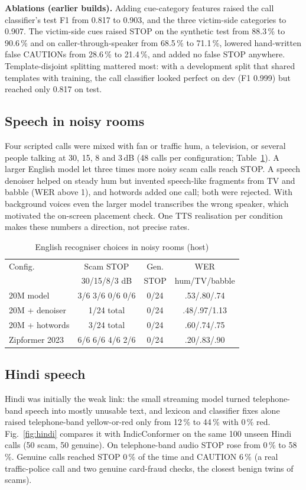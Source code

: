 \documentclass[conference]{IEEEtran}
\begin{document}
\textbf{Ablations (earlier builds).} Adding cue-category features raised the call classifier's test F1 from 0.817 to 0.903, and the three victim-side categories to 0.907. The victim-side cues raised STOP on the synthetic test from 88.3\,\% to 90.6\,\% and on caller-through-speaker from 68.5\,\% to 71.1\,\%, lowered hand-written false CAUTIONs from 28.6\,\% to 21.4\,\%, and added no false STOP anywhere. Template-disjoint splitting mattered most: with a development split that shared templates with training, the call classifier looked perfect on dev (F1 0.999) but reached only 0.817 on test.

\subsection{Speech in noisy rooms}
Four scripted calls were mixed with fan or traffic hum, a television, or several people talking at 30, 15, 8 and 3\,dB (48 calls per configuration; Table~\ref{tab:noise}). A larger English model let three times more noisy scam calls reach STOP. A speech denoiser helped on steady hum but invented speech-like fragments from TV and babble (WER above 1), and hotwords added one call; both were rejected. With background voices even the larger model transcribes the wrong speaker, which motivated the on-screen placement check. One TTS realisation per condition makes these numbers a direction, not precise rates.

\begin{table}[t]
\caption{English recogniser choices in noisy rooms (host)}
\label{tab:noise}
\centering
\footnotesize
\setlength{\tabcolsep}{2.5pt}
\begin{tabular}{@{}lccc@{}}
\toprule
Config. & Scam STOP & Gen. & WER \\
 & 30/15/8/3 dB & STOP & hum/TV/babble \\
\midrule
20M model & 3/6 3/6 0/6 0/6 & 0/24 & .53/.80/.74 \\
20M + denoiser & 1/24 total & 0/24 & .48/.97/1.13 \\
20M + hotwords & 3/24 total & 0/24 & .60/.74/.75 \\
Zipformer 2023 & 6/6 6/6 4/6 2/6 & 0/24 & .20/.83/.90 \\
\bottomrule
\end{tabular}
\end{table}

\subsection{Hindi speech}\label{sec:hindi}
Hindi was initially the weak link: the small streaming model turned telephone-band speech into mostly unusable text, and lexicon and classifier fixes alone raised telephone-band yellow-or-red only from 12\,\% to 44\,\% with 0\,\% red. Fig.~\ref{fig:hindi} compares it with IndicConformer on the same 100 unseen Hindi calls (50 scam, 50 genuine). On telephone-band audio STOP rose from 0\,\% to 58\,\%. Genuine calls reached STOP 0\,\% of the time and CAUTION 6\,\% (a real traffic-police call and two genuine card-fraud checks, the closest benign twins of scams).
\end{document}
